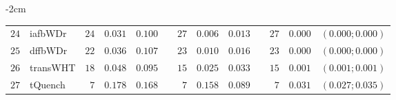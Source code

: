 \begin{table*}[!htbp]
\begin{adjustwidth*}{}{-2cm}
\begin{tabular}{@{}rlrrrrrrrrrcc@{}}
\footnotesize{$24$} & \footnotesize{iafbWDr  } & \footnotesize{$24$} & \footnotesize{$0.031$} & \footnotesize{$0.100$} && \footnotesize{$27$} & \footnotesize{$0.006$} & \footnotesize{$0.013$} && \footnotesize{$27$} & \footnotesize{$0.000$} & \footnotesize{$(0.000;0.000)$} \\
\footnotesize{$25$} & \footnotesize{dffbWDr  } & \footnotesize{$22$} & \footnotesize{$0.036$} & \footnotesize{$0.107$} && \footnotesize{$23$} & \footnotesize{$0.010$} & \footnotesize{$0.016$} && \footnotesize{$23$} & \footnotesize{$0.000$} & \footnotesize{$(0.000;0.000)$} \\
\footnotesize{$26$} & \footnotesize{transWHT } & \footnotesize{$18$} & \footnotesize{$0.048$} & \footnotesize{$0.095$} && \footnotesize{$15$} & \footnotesize{$0.025$} & \footnotesize{$0.033$} && \footnotesize{$15$} & \footnotesize{$0.001$} & \footnotesize{$(0.001;0.001)$} \\
\footnotesize{$27$} & \footnotesize{tQuench  } & \footnotesize{$7 $} & \footnotesize{$0.178$} & \footnotesize{$0.168$} && \footnotesize{$7 $} & \footnotesize{$0.158$} & \footnotesize{$0.089$} && \footnotesize{$7 $} & \footnotesize{$0.031$} & \footnotesize{$(0.027;0.035)$} \\
\bottomrule
\end{tabular}
\end{adjustwidth*}
\end{table*}

